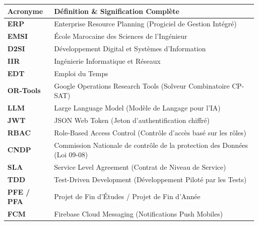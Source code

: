 \documentclass[11pt,a4paper]{report}
\begin{document}
\begin{table}[h!]
\centering
\renewcommand{\arraystretch}{1.4}
\begin{tabularx}{\textwidth}{p{3.5cm} X}
\toprule
\textbf{Acronyme} & \textbf{Définition \& Signification Complète} \\
\midrule
\textbf{ERP} & Enterprise Resource Planning (Progiciel de Gestion Intégré) \\
\textbf{EMSI} & École Marocaine des Sciences de l'Ingénieur \\
\textbf{D2SI} & Développement Digital et Systèmes d'Information \\
\textbf{IIR} & Ingénierie Informatique et Réseaux \\
\textbf{EDT} & Emploi du Temps \\
\textbf{OR-Tools} & Google Operations Research Tools (Solveur Combinatoire CP-SAT) \\
\textbf{LLM} & Large Language Model (Modèle de Langage pour l'IA) \\
\textbf{JWT} & JSON Web Token (Jeton d'authentification chiffré) \\
\textbf{RBAC} & Role-Based Access Control (Contrôle d'accès basé sur les rôles) \\
\textbf{CNDP} & Commission Nationale de contrôle de la protection des Données (Loi 09-08) \\
\textbf{SLA} & Service Level Agreement (Contrat de Niveau de Service) \\
\textbf{TDD} & Test-Driven Development (Développement Piloté par les Tests) \\
\textbf{PFE / PFA} & Projet de Fin d'Études / Projet de Fin d'Année \\
\textbf{FCM} & Firebase Cloud Messaging (Notifications Push Mobiles) \\
\bottomrule
\end{tabularx}
\end{table}

\clearpage

\listoffigures
{}

\vspace{1cm}

\listoftables
{}

\clearpage
\end{document}
